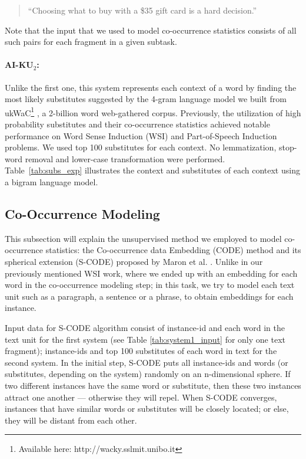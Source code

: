 \documentclass[11pt]{article}
\begin{document}
\begin{quote}
``Choosing what to buy with a \$35 gift card is a hard decision.''
\end{quote}

Note that the input that we used to model co-occurrence statistics consists of all such pairs for each fragment in a given subtask.  

\paragraph{AI-KU$_2$:} Unlike the first one, this system represents each context of a word by finding the most likely substitutes suggested by the 4-gram language model we built from ukWaC\footnote{Available here: http://wacky.sslmit.unibo.it} \cite{ukWaC}, a 2-billion word web-gathered corpus. Previously, the utilization of high probability substitutes and their co-occurrence statistics achieved notable performance on Word Sense Induction (WSI) \cite{baskaya13ai} and Part-of-Speech Induction \cite{yatbaz2012learning} problems. We used top 100 substitutes for each context. No lemmatization, stop-word removal and lower-case transformation were performed. Table~\ref{tab:subs_exp} illustrates the context and substitutes of each context using a bigram language model.

\subsection{Co-Occurrence Modeling}

This subsection will explain the unsupervised method we employed to model co-occurrence statistics: the Co-occurrence data Embedding (CODE) method \cite{globerson-CODE} and its spherical extension (S-CODE) proposed by Maron et al. . Unlike in our previously mentioned WSI work, where we ended up with an embedding for each
word in the co-occurrence modeling step; in this task, we try to model each text unit such as a paragraph, a sentence or a phrase, to obtain embeddings for each instance. 

Input data for S-CODE algorithm consist of instance-id and each word in the text unit for the first system (see Table \ref{tab:system1_input} for only one text fragment); instance-ids and top 100 substitutes of each word in text for the second system. In the initial step, S-CODE puts all instance-ids and words (or substitutes, depending on the system) randomly on an n-dimensional sphere. If two different instances have the same word or substitute, then these two instances attract one another --- otherwise they will repel. When S-CODE converges, instances that have similar words or substitutes will be closely located; or else, they will be distant from each other. 
\end{document}
